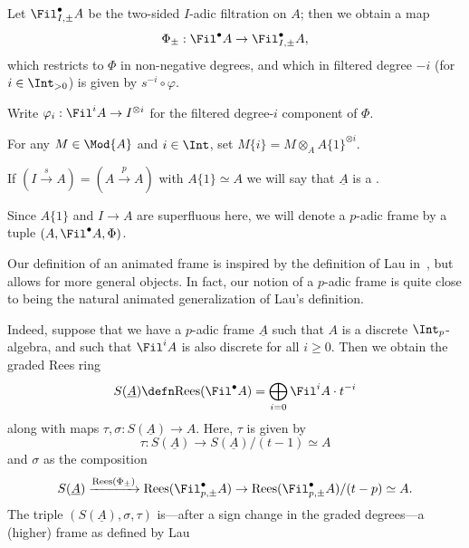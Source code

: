 \documentclass[10pt]{amsart}
\begin{document}
Let $\Fil^\bullet_{I,\pm}A$ be the two-sided $I$-adic filtration on $A$; then we obtain a map
\[
\Phi_{\pm}:\Fil^\bullet A \to \Fil^\bullet_{I,\pm} A,
\]
which restricts to $\Phi$ in non-negative degrees, and which in filtered degree $-i$ (for $i\in \Int_{>0}$) is given by $s^{-i}\circ\varphi$.

Write $\varphi_i:\Fil^iA \to I^{\otimes i}$ for the filtered degree-$i$ component of $\Phi$.

For any $M\in\Mod{A}$ and $i\in\Int$, set $M\{i\} = M\otimes_AA\{1\}^{\otimes i}$.

\begin{definition}
\label{defn:p-adic_frames}
If $(I \xrightarrow{s} A) = (A\xrightarrow{p} A)$ with $A\{1\}\simeq A$ we will say that $\underline{A}$ is a . 

Since $A\{1\}$ and $I\to A$ are superfluous here, we will denote a $p$-adic frame by a tuple $(A,\Fil^\bullet A,\Phi)$.
\end{definition}



\begin{remark}
\label{rem:relationship_with_lau}
Our definition of an animated frame is inspired by the definition of Lau in~\cite[\S 2]{MR4355476}, but allows for more general objects. In fact, our notion of a $p$-adic frame is quite close to being the natural animated generalization of Lau's definition. 

Indeed, suppose that we have a $p$-adic frame $\underline{A}$ such that $A$ is a discrete $\Int_p$-algebra, and such that $\Fil^i A$ is also discrete for all $i\ge 0$. Then we obtain the graded Rees ring
\[
 S(\underline{A}) \defn \mathrm{Rees}(\Fil^\bullet A) = \bigoplus_{i=0}\Fil^iA\cdot t^{-i}
\]
along with maps $\tau,\sigma:S(\underline{A}) \to A$. Here, $\tau$ is given by 
\[
\tau:S(\underline{A})\to S(\underline{A})/(t-1)\simeq A
\]
and $\sigma$ as the composition
\[
S(\underline{A}) \xrightarrow{\mathrm{Rees}(\Phi_{\pm})} \mathrm{Rees}(\Fil^\bullet_{p,\pm}A)\to \mathrm{Rees}(\Fil^\bullet_{p,\pm}A)/(t-p)\simeq A.
\]
The triple $(S(\underline{A}),\sigma,\tau)$ is---after a sign change in the graded degrees---a (higher) frame as defined by Lau~\cite[Definition 2.0.1]{MR4355476} 
\end{remark}
\end{document}
